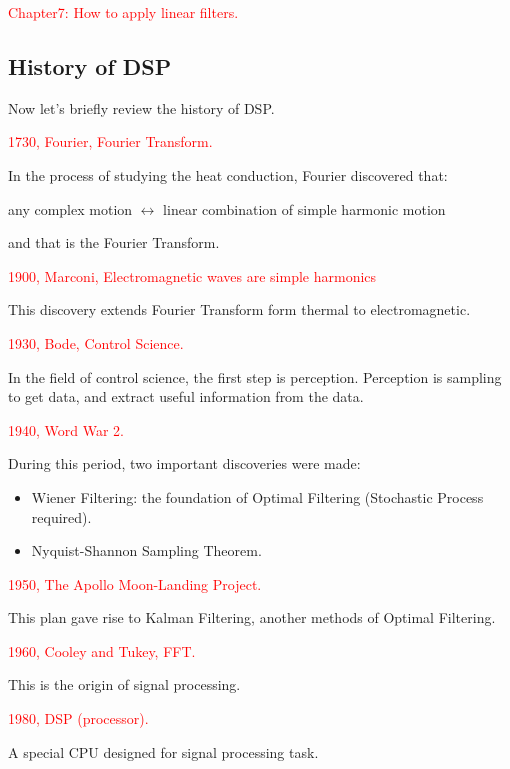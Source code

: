         \noindent \textcolor{red}{Chapter7: How to apply linear filters.}
    
    \newpage
    \subsection{History of DSP}
        Now let's briefly review the history of DSP.

        \noindent \textcolor{red}{1730, Fourier, Fourier Transform.}

        In the process of studying the heat conduction, 
        Fourier discovered that:
            \begin{center}
                any complex motion $\longleftrightarrow$ linear combination of simple harmonic motion
            \end{center}
        and that is the Fourier Transform.

        \noindent \textcolor{red}{1900, Marconi, Electromagnetic waves are simple harmonics}

        This discovery extends Fourier Transform form thermal to electromagnetic.

        \noindent \textcolor{red}{1930, Bode, Control Science.}

        In the field of control science, the first step is perception. 
        Perception is sampling to get data, and extract useful information from the data.
        
        \noindent \textcolor{red}{1940, Word War 2.}

        During this period, two important discoveries were made:
            \begin{itemize}
                \item Wiener Filtering: the foundation of Optimal Filtering (Stochastic Process required).
                \item Nyquist-Shannon Sampling Theorem.
            \end{itemize}
        
        \noindent \textcolor{red}{1950, The Apollo Moon-Landing Project.}

        This plan gave rise to Kalman Filtering, another methods of Optimal Filtering.

        \noindent \textcolor{red}{1960, Cooley and Tukey, FFT.}

        This is the origin of signal processing.

        \noindent \textcolor{red}{1980, DSP (processor).}

        A special CPU designed for signal processing task.


        


        



        



        